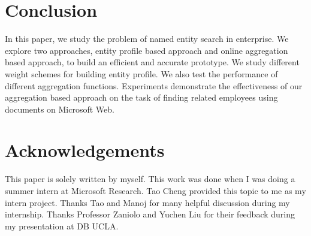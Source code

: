 \documentclass{sig-alternate}
\theoremstyle{definition}
\begin{document}
\section{Conclusion}\label{sec:conclusion}
In this paper, we study the problem of named entity search in enterprise. We explore two approaches, entity profile based approach and online aggregation based approach, to build an efficient and accurate prototype. We study different weight schemes for building entity profile. We also test the performance of different aggregation functions. Experiments demonstrate the effectiveness of our aggregation based approach on the task of finding related employees using documents on Microsoft Web.

\section{Acknowledgements}
This paper is solely written by myself. This work was done when I was doing a summer intern at Microsoft Research. Tao Cheng provided this topic to me as my intern project. Thanks Tao and Manoj for many helpful discussion during my internship. Thanks Professor Zaniolo and Yuchen Liu for their feedback during my presentation at DB UCLA.

{ }
\end{document}
